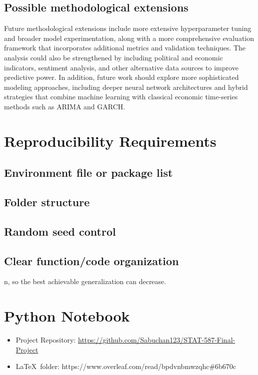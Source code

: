 \documentclass[11pt]{article}
\begin{document}
\subsection{Possible methodological extensions}

Future methodological extensions include more extensive hyperparameter tuning and broader model experimentation, along with a more comprehensive evaluation framework that incorporates additional metrics and validation techniques. The analysis could also be strengthened by including political and economic indicators, sentiment analysis, and other alternative data sources to improve predictive power. In addition, future work should explore more sophisticated modeling approaches, including deeper neural network architectures and hybrid strategies that combine machine learning with classical economic time-series methods such as ARIMA and GARCH.

\section{Reproducibility Requirements}

\subsection{Environment file or package list}

\subsection{Folder structure}
\subsection{Random seed control}
\subsection{Clear function/code organization}

n, so the best achievable generalization can decrease.
\section*{Python Notebook}
 \begin{itemize}
    \item Project Repository: \url{https://github.com/Sabuchan123/STAT-587-Final-Project}
    \item \LaTeX \ folder: https://www.overleaf.com/read/bpdvnbmwzqhc\#6b670c
 \end{itemize}
\end{document}
